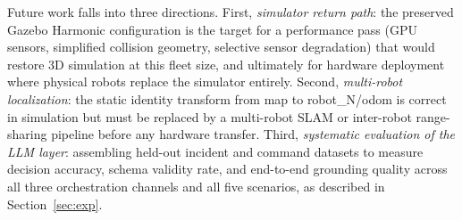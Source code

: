 \documentclass[conference]{IEEEtran}
\begin{document}
Future work falls into three directions. First,
\emph{simulator return path}: the preserved Gazebo Harmonic
configuration is the target for a performance pass (GPU
sensors, simplified collision geometry, selective sensor
degradation) that would restore 3D simulation at this fleet
size, and ultimately for hardware deployment where physical
robots replace the simulator entirely. Second,
\emph{multi-robot localization}: the static identity
transform from \textsf{map} to \textsf{robot\_N/odom} is
correct in simulation but must be replaced by a multi-robot
SLAM or inter-robot range-sharing pipeline before any hardware
transfer. Third, \emph{systematic evaluation of the LLM
layer}: assembling held-out incident and command datasets to
measure decision accuracy, schema validity rate, and
end-to-end grounding quality across all three orchestration
channels and all five scenarios, as described in
Section~\ref{sec:exp}.
\end{document}
